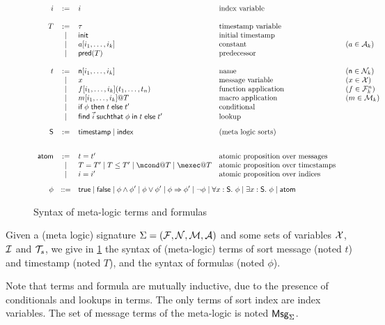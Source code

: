 \begin{figure}[t]
  \begin{gather*}
    \begin{array}{rclll}
      i &:=& i & \text{index variable} & \\
      \\
      T &:=& \tau & \text{timestamp variable} & \\
      &\mid& \tinit & \text{initial timestamp} & \\
      &\mid& a[i_1,\ldots,i_k] & \text{constant} & (a\in\Act_k) \\
      &\mid & \pre(T) & \text{predecessor} & \\
      \\
      t & := & \mathsf{n}[i_1,\ldots,i_k] &\text{name} & (\mathsf{n}\in\N_k) \\
      & \mid & x  & \text{message variable} & (x\in\X) \\
      & \mid & f[i_1,\ldots,i_k](t_1,\dots,t_n) &\text{function application} &
      (f\in\F_k^n)\\
      & \mid & m[i_1,\ldots,i_k]@T &\text{macro application} & (m\in\Mac_k)\\
      & \mid & \myif \phi \mythen t \myelse t'
      &\text{conditional} \\
      & \mid & \myfind \vec{i} \mysuchthat \phi \myin t \myelse t'
      &\text{lookup}
      \\[2ex]
      \Sort &  := & \timestamp \mid \idx & \text{(meta logic sorts)} \\
      \\[2ex]
      \atom & := & t=t'
      & \text{atomic proposition over messages } \\
      &\mid & T=T' \mid T \leq T' \mid \mcond@T \mid \mexec@T &  \text{atomic proposition
        over timestamps } \\
      &\mid & i=i'  &  \text{atomic proposition
        over indices }
      \\[2ex]
      \phi & ::= &  \lefteqn{\true \mid \false \mid \phi \wedge \phi' \mid  \phi
      \vee \phi' \mid   \phi \Rightarrow \phi'\mid \neg \phi \mid
      \forall x : \Sort.\ \phi \mid \exists x:\Sort.\ \phi \mid \atom }
    \end{array}
  \end{gather*}
  \caption{Syntax of meta-logic terms and formulas}
  \label{fig:terms-form}
\end{figure}

\begin{definition}
  Given a (meta logic) signature $\Sigma = (\mathcal{F},\mathcal{N},\mathcal{M},\mathcal{A})$
  and some sets of variables
  $\mathcal{X}$, $\mathcal{I}$ and ${\mathcal{T}_s}$,
  we give in \cref{fig:terms-form} the syntax of (meta-logic) terms
  of sort message (noted $t$) and timestamp (noted $T$),
  and the syntax of formulas (noted $\phi$).  
  
  Note that terms and formula are mutually inductive, due to the presence
  of conditionals and lookups in terms.
  The only terms of sort index are index variables.
  The set of message terms of the meta-logic is noted $\mathsf{Msg}_\Sigma$.
\end{definition}

